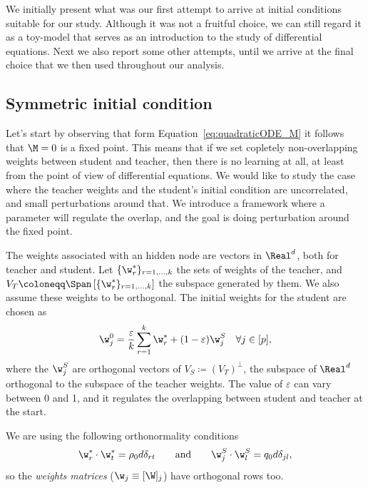 We initially present what was our first attempt to arrive at initial conditions suitable for our study.
Although it was not a fruitful choice,
we can still regard it as a toy-model that serves as an introduction to the study of differential equations.
Next we also report some other attempts, until we arrive at the final choice that we then used throughout our analysis.

\subsection{Symmetric initial condition} \label{subsec:symmetric_init}
Let's start by observing that form Equation~\eqref{eq:quadraticODE_M} it follows
that \(\M=0\) is a fixed point. This means that if we set copletely non-overlapping
weights between student and teacher, then there is no learning at all, at least 
from the point of view of differential equations.
We would like to study the case where the teacher weights and the student's initial condition are uncorrelated,
and small perturbations around that. We introduce a framework where a parameter will
regulate the overlap, and the goal is doing perturbation around the fixed point.

The weights associated with an hidden node are vectors in \(\Real^d\), both for teacher and student.
Let \(\{\w^*_r\}_{r=1,\dots,k}\) the sets of weights of the teacher,
and \(V_T \coloneqq \Span\left[\{\w^*_r\}_{r=1,\dots,k}\right]\) the subspace generated by them.
We also assume these weights to be orthogonal. The initial weights for the student are chosen as
\[
    \w_j^0 = \frac{\varepsilon}{k} \sum_{r=1}^k \w^*_r + (1-\varepsilon) \w_j^S \quad
    \forall j\in [p],
\]
where the \(\w_j^S\) are orthogonal vectors of \(V_S \coloneqq (V_T)^\bot\),
the subspace of \(\Real^d\) orthogonal to the subspace of the teacher weights. 
The value of \(\varepsilon\) can vary between 0 and 1,
and it regulates the overlapping between student and teacher at the start.

We are using the following orthonormality conditions
\[
  \w^*_r \cdot \w^*_t = \rho_0d\delta_{rt}
  \qquad\text{and}\qquad
  \w_j^S\cdot\w_l^S=q_0d\delta_{jl},
\]
so the \emph{weights matrices} (\(\w_j \equiv [\W]_j\)) have orthogonal rows too.


